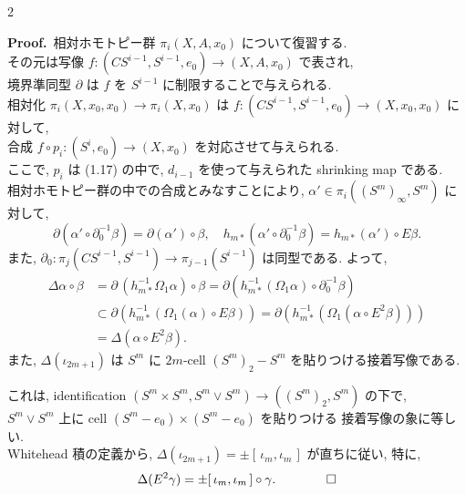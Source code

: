 \documentclass[10pt, leqno]{ltjsarticle} %
\numberwithin{equation}{section}
\theoremstyle{plain}
\theoremstyle{definition}
\theoremstyle{remark}
\begin{document}
\begin{paracol}{2}

\noindent
\textbf{Proof.}\
相対ホモトピー群 $\pi_i(X,A,x_0)$ について復習する. \\
その元は写像 $f:(CS^{i-1},S^{i-1},e_0)\to (X,A,x_0)$ で表され, \\
境界準同型 $\partial$ は $f$ を $S^{i-1}$ に制限することで与えられる. \\
相対化 $\pi_i(X, x_0, x_0)\to\pi_i(X,x_0)$ は
$f:(CS^{i-1},S^{i-1},e_0)\to(X,x_0,x_0)$ に対して, \\
合成 $f\circ p_i:(S^i,e_0)\to(X,x_0)$ を対応させて与えられる. \\
ここで, $p_i$ は (1.17) の中で, 
\(d_{i-1}\) を使って与えられた shrinking map である. \\
相対ホモトピー群の中での合成とみなすことにより, 
\(\alpha'\in\pi_i((S^m)_\infty, S^m)\)
に対して, 
\[
\partial(\alpha'\circ\partial_0^{-1}\beta) = \partial(\alpha')\circ \beta,\quad
h_{m*}(\alpha'\circ\partial_0^{-1}\beta) = h_{m*}(\alpha')\circ E\beta .
\]
また, 
\(
\partial_0:\pi_j(CS^{i-1},S^{i-1})\rightarrow \pi_{j-1}(S^{i-1})
\)
は同型である. よって,
\begin{align*}
\Delta\alpha\circ\beta
& =\partial\,(h_{m*}^{-1}\Omega_1\alpha)\circ\beta
=\partial(h_{m*}^{-1}(\Omega_1\alpha)\circ \partial_0^{-1}\beta)\\
& \subset \partial(h_{m*}^{-1}(\Omega_1(\alpha)\circ E\beta))
=\partial(h_{m*}^{-1}(\Omega_1(\alpha\circ E^2\beta)))\\
& =\Delta(\alpha\circ E^2\beta).
\end{align*}
また, $\Delta(\iota_{2m+1})$ は
\(S^m\) に \(2m\)-cell $(S^m)_2 - S^m$ を貼りつける接着写像である. 

これは, identification $(S^m\times S^m, S^m\vee S^m)\to((S^m)_2,S^m)$ の下で, \\
\(S^m\vee S^m\) 上に cell \((S^m-e_0)\times(S^m-e_0)\) を貼りつける 
接着写像の象に等しい. \\
Whitehead 積の定義から,
\(
\Delta(\iota_{2m+1})=\pm[\,\iota_m,\iota_m\,]
\)
が直ちに従い, 特に,
\[
\Delta(E^2\gamma)=\pm[\,\iota_m,\iota_m\,]\circ\gamma.\qquad \qed
\]

\switchcolumn

\noindent
{}


\end{paracol}
\end{document}
